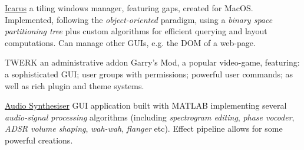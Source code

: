 
\begin{cvopensource}
  \cvproject
    {\href{https://github.com/Braden1996/Icarus}{Icarus}}
    {
      a tiling windows manager, featuring gaps, created for MacOS. Implemented, following the \textit{object-oriented} paradigm, using a \textit{binary space partitioning tree} plus custom algorithms for efficient querying and layout computations. Can manage other GUIs, e.g. the DOM of a web-page.
    }

  \cvproject
    {TWERK}
    {
      an administrative addon Garry's Mod, a popular video-game, featuring: a sophisticated GUI; user groups with permissions; powerful user commands; as well as rich plugin and theme systems.
    }

  \cvproject
    {\href{https://github.com/Braden1996/Audio-Synthesiser}{Audio Synthesiser}}
    {
      GUI application built with MATLAB implementing several \textit{audio-signal processing} algorithms (including \textit{spectrogram editing}, \textit{phase vocoder}, \textit{ADSR volume shaping}, \textit{wah-wah}, \textit{flanger} etc). Effect pipeline allows for some powerful creations.
    }
\end{cvopensource}

